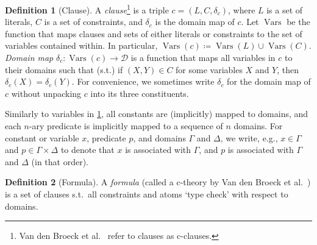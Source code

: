 \documentclass{article}
\theoremstyle{definition}
\newtheorem{definition}{Definition}
\DeclareMathOperator{\Vars}{Vars}
\begin{document}
\begin{definition}[Clause]\label{def:clause}
  A \emph{clause}\footnote{Van den Broeck et
    al.~ refer to clauses as c-clauses.}
  is a triple $c = (L, C, \delta_c)$, where $L$ is a set of literals, $C$ is a
  set of constraints, and $\delta_c$ is the domain map of $c$. Let $\Vars$ be
  the function that maps clauses and sets of either literals or constraints to
  the set of variables contained within. In particular,
  $\Vars(c) \coloneqq \Vars(L) \cup \Vars(C)$. \emph{Domain map}
  $\delta_{c}\colon \Vars(c) \to \mathcal{D}$ is a function that maps all
  variables in $c$ to their domains such that (s.t.) if $(X, Y) \in C$ for some
  variables $X$ and $Y$, then $\delta_c(X) = \delta_c(Y)$. For convenience, we
  sometimes write $\delta_c$ for the domain map of $c$ without unpacking $c$
  into its three constituents.
\end{definition}

Similarly to variables in \cref{def:clause}, all constants are (implicitly)
mapped to domains, and each $n$-ary predicate is implicitly mapped to a sequence
of $n$ domains. For constant or variable $x$, predicate $p$, and domains
$\Gamma$ and $\Delta$, we write, e.g., $x \in \Gamma$ and
$p \in \Gamma \times \Delta$ to denote that $x$ is associated with $\Gamma$, and
$p$ is associated with $\Gamma$ and $\Delta$ (in that order).

\begin{definition}[Formula]\label{def:formula}
  A \emph{formula} (called a c-theory by Van den Broeck et
  al.~) is a set of clauses s.t.\ all
  constraints and atoms `type check' with respect to domains.
\end{definition}
\end{document}

